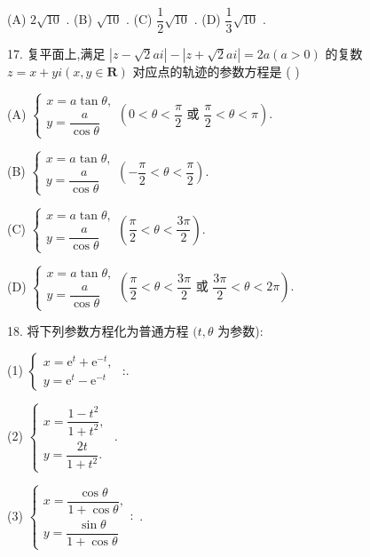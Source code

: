 (A) $2\sqrt{10}$ . (B) $\sqrt{10}$ . (C) $\dfrac{1}{2}\sqrt{10}$ . (D) $\dfrac{1}{3}\sqrt{10}$ .

17. 复平面上,满足 $\left| {z - \sqrt{2}{ai}}\right|  - \left| {z + \sqrt{2}{ai}}\right|  = {2a}\left( {a > 0}\right)$ 的复数 $z = x + {yi}\left( {x,y \in  \mathbf{R}}\right)$ 对应点的轨迹的参数方程是 (   )

(A) $\left\{  {\begin{array}{l} x = a\tan \theta , \\  y = \dfrac{a}{\cos \theta } \end{array}\left( {0 < \theta  < \dfrac{\pi }{2}\text{ 或 }\dfrac{\pi }{2} < \theta  < \pi }\right) .}\right.$

(B) $\left\{  {\begin{array}{l} x = a\tan \theta , \\  y = \dfrac{a}{\cos \theta } \end{array}\left( {-\dfrac{\pi }{2} < \theta  < \dfrac{\pi }{2}}\right) .}\right.$

(C) $\left\{  {\begin{array}{l} x = a\tan \theta , \\  y = \dfrac{a}{\cos \theta } \end{array}\left( {\dfrac{\pi }{2} < \theta  < \dfrac{3\pi }{2}}\right) .}\right.$

(D) $\left\{  {\begin{array}{l} x = a\tan \theta , \\  y = \dfrac{a}{\cos \theta } \end{array}\left( {\dfrac{\pi }{2} < \theta  < \dfrac{3\pi }{2}\text{ 或 }\dfrac{3\pi }{2} < \theta  < {2\pi }}\right) .}\right.$

18. 将下列参数方程化为普通方程 $(t,\theta$ 为参数):

(1) $\left\{  \begin{array}{l} x = {\mathrm{e}}^{t} + {\mathrm{e}}^{-t}, \\  y = {\mathrm{e}}^{t} - {\mathrm{e}}^{-t} \end{array}\right.$ :\blkda{}.

(2) $\left\{  \begin{array}{l} x = \dfrac{1 - {t}^{2}}{1 + {t}^{2}}, \\  y = \dfrac{2t}{1 + {t}^{2}}. \end{array}\right.$ \blkda{}.

(3) $\left\{  {\begin{array}{l} x = \dfrac{\cos \theta }{1 + \cos \theta }, \\  y = \dfrac{\sin \theta }{1 + \cos \theta } \end{array} : }\right.$ \blkda{}.

